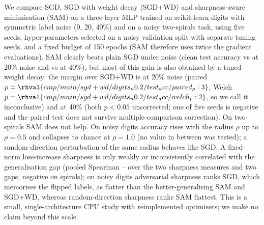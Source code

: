 We compare SGD, SGD with weight decay (SGD+WD) and sharpness-aware minimisation (SAM) on a three-layer MLP trained on scikit-learn digits with symmetric label noise (0, 20, 40\%) and on a noisy two-spirals task, using five seeds, hyper-parameters selected on a noisy validation split with separate tuning seeds, and a fixed budget of 150 epochs (SAM therefore uses twice the gradient evaluations).
SAM clearly beats plain SGD under noise (clean test accuracy  vs  at 20\% noise and  vs  at 40\%), but most of this gain is also obtained by a tuned weight decay: the margin over SGD+WD is  at 20\% noise (paired $p=\rhval{cmp/main/sgd+wd/digits_n0.2/test_acc/paired_p:3}$, Welch $p=\rhval{cmp/main/sgd+wd/digits_n0.2/test_acc/welch_p:2}$, so we call it inconclusive) and  at 40\% (both $p<0.05$ uncorrected; one of five seeds is negative and the paired test does not survive multiple-comparison correction). On two-spirals SAM does not help.
On noisy digits accuracy rises with the radius $\rho$ up to $\rho=0.5$ and collapses to chance at $\rho=1.0$ (no value in between was tested); a random-direction perturbation of the same radius behaves like SGD.
A fixed-norm loss-increase sharpness is only weakly or inconsistently correlated with the generalisation gap (pooled Spearman -- over the two sharpness measures and two gaps, negative on spirals); on noisy digits adversarial sharpness ranks SGD, which memorises the flipped labels, as flatter than the better-generalising SAM and SGD+WD, whereas random-direction sharpness ranks SAM flattest.
This is a small, single-architecture CPU study with reimplemented optimisers; we make no claim beyond this scale.
